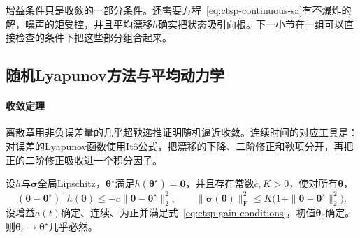 增益条件只是收敛的一部分条件。还需要方程~\eqref{eq:ctsp-continuous-sa}有不爆炸的解，噪声的矩受控，并且平均漂移$h$确实把状态吸引向根。下一小节在一组可以直接检查的条件下把这些部分组合起来。

\subsection{随机Lyapunov方法与平均动力学}
\label{sec:ctsp-sa-lyapunov}

\paragraph{收敛定理}
离散章用非负误差量的几乎超鞅递推证明随机逼近收敛。连续时间的对应工具是：对误差的Lyapunov函数使用Itô公式，把漂移的下降、二阶修正和鞅项分开，再把正的二阶修正吸收进一个积分因子。

\begin{theorem}[连续时间随机逼近的收敛]
  \label{thm:ctsp-sa-convergence}
  设$h$与$\bm\sigma$全局Lipschitz，$\bm\theta^\star$满足$h(\bm\theta^\star)=\bm0$，并且存在常数$c,K>0$，使对所有$\bm\theta$，
  \[
    (\bm\theta-\bm\theta^\star)^\top h(\bm\theta)\leq-c\|\bm\theta-\bm\theta^\star\|_2^2,\qquad
    \|\bm\sigma(\bm\theta)\|_{\mathrm F}^2\leq K\bigl(1+\|\bm\theta-\bm\theta^\star\|_2^2\bigr).
  \]
  设增益$a(t)$确定、连续、为正并满足式~\eqref{eq:ctsp-gain-conditions}，初值$\bm\theta_0$确定。则$\bm\theta_t\to\bm\theta^\star$几乎必然。
\end{theorem}

